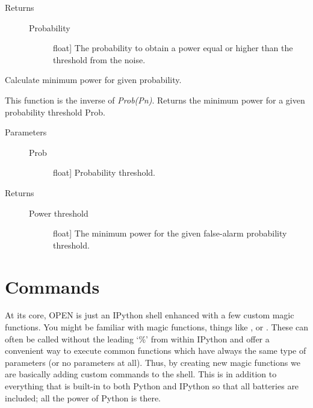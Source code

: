 \documentclass[letterpaper,10pt,english]{sphinxmanual}
\begin{document}
\begin{fulllineitems}
\begin{fulllineitems}
\begin{description}
\begin{description}
\end{description}

\item[{Returns}] \leavevmode\begin{description}
\item[{Probability}] \leavevmode{[}float{]}
The probability to obtain a power equal or
higher than the threshold from the noise.

\end{description}

\end{description}

\end{fulllineitems}


\begin{fulllineitems}
\label{api:OPEN.periodograms.bls.probInv}
Calculate minimum power for given probability.

This function is the inverse of \emph{Prob(Pn)}.
Returns the minimum power for a given probability threshold Prob.
\begin{description}
\item[{Parameters}] \leavevmode\begin{description}
\item[{Prob}] \leavevmode{[}float{]}
Probability threshold.

\end{description}

\item[{Returns}] \leavevmode\begin{description}
\item[{Power threshold}] \leavevmode{[}float{]}
The minimum power for the given
false-alarm probability threshold.

\end{description}

\end{description}

\end{fulllineitems}


\end{fulllineitems}



\chapter{Commands}
\label{commands:commands}\label{commands::doc}
At its core, OPEN is just an IPython shell enhanced with a few custom magic functions. You might be familiar with magic functions, things like ,  or . These can often be called without the leading `\%' from within IPython and offer a convenient way to execute common functions which have always the same type of parameters (or no parameters at all). Thus, by creating new magic functions we are basically adding custom commands to the shell. This is in addition to everything that is built-in to both Python and IPython so that all batteries are included; all the power of Python is there.
\end{document}
